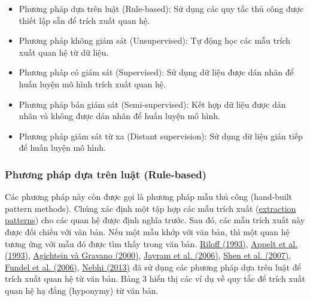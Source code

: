 \begin{itemize}
    \item Phương pháp dựa trên luật ({Rule-based}): Sử dụng các quy tắc thủ công được thiết lập sẵn để trích xuất quan hệ.
    \item Phương pháp không giám sát (Unsupervised): Tự động học các mẫu trích xuất quan hệ từ dữ liệu.
    \item Phương pháp có giám sát (Supervised): Sử dụng dữ liệu được dán nhãn để huấn luyện mô hình trích xuất quan hệ.
    \item Phương pháp bán giám sát (Semi-supervised): Kết hợp dữ liệu được dán nhãn và không được dán nhãn để huấn luyện mô hình.
    \item Phương pháp giám sát từ xa (Distant supervision): Sử dụng dữ liệu gián tiếp để huấn luyện mô hình.
\end{itemize}

\subsubsection{Phương pháp dựa trên luật ({Rule-based})}
Các phương pháp này còn được gọi là phương pháp mẫu thủ công (hand-built pattern methods).
Chúng xác định một tập hợp các mẫu trích xuất (\href{https://www.sciencedirect.com/topics/computer-science/extraction-pattern}{extraction patterns}) cho các quan hệ được định nghĩa trước.
Sau đó, các mẫu trích xuất này được đối chiếu với văn bản. Nếu một mẫu khớp với văn bản, thì một quan hệ tương ứng với
mẫu đó được tìm thấy trong văn bản.
\href{https://www.scopus.com/record/display.uri?eid=2-s2.0-0027709268&origin=inward&txGid=dd620e007b93bb0bb26ec41071050554}{Riloff (1993)},
\href{https://scholar.google.com/scholar_lookup?title=Fastus%3A%20A%20finite-state%20processor%20for%20information%20extraction%20from%20real-world%20text&publication_year=1993&author=D.%20Appelt&author=J.%20Hobbs&author=J.%20Bear&author=D.%20Israel&author=M.%20Tyson}{Appelt et al. (1993)},
\href{https://scholar.google.com/scholar_lookup?title=Snowball%3A%20Extracting%20relations%20from%20large%20plain-text%20collections&publication_year=2000&author=E.%20Agichtein&author=L.%20Gravano}{Agichtein và Gravano (2000)},
\href{https://scholar.google.com/scholar_lookup?title=Avatar%20information%20extraction%20system&publication_year=2006&author=T.%20Jayram&author=R.%20Krishnamurthy&author=S.%20Raghavan&author=S.%20Vaithyanathan&author=H.%20Zhu}{Jayram et al. (2006)},
\href{https://www.scopus.com/inward/record.url?eid=2-s2.0-77951560898&partnerID=10&rel=R3.0.0}{Shen et al. (2007)},
\href{https://scholar.google.com/scholar_lookup?title=RelEx%20relation%20extraction%20using%20dependency%20parse%20trees&publication_year=2006&author=K.%20Fundel&author=R.%20K%C3%BCffner&author=R.%20Zimmer}{Fundel et al. (2006)},
\href{https://scholar.google.com/scholar_lookup?title=A%20rule-based%20relation%20extraction%20system%20using%20dbpedia%20and%20syntactic%20parsing&publication_year=2013&author=K.%20Nebhi}{Nebhi (2013)} đã sử dụng các phương pháp dựa trên luật để trích xuất quan hệ từ văn bản.
Bảng 3 hiển thị các ví dụ về quy tắc để trích xuất quan hệ hạ đẳng (hyponymy) từ văn bản.


